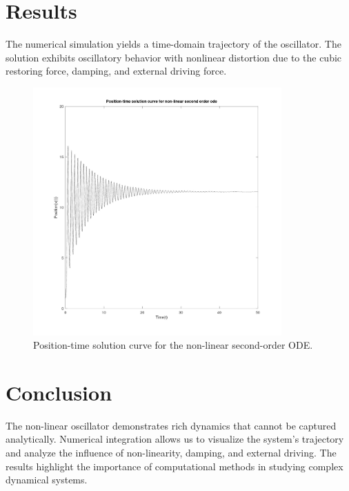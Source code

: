 \section*{Results}
The numerical simulation yields a time-domain trajectory of the oscillator. The solution exhibits oscillatory behavior with nonlinear distortion due to the cubic restoring force, damping, and external driving force.

\begin{figure}[h!]
    \centering
    \includegraphics[width=0.85\textwidth]{a4.jpg}
    \caption{Position-time solution curve for the non-linear second-order ODE.}
\end{figure}

\section*{Conclusion}
The non-linear oscillator demonstrates rich dynamics that cannot be captured analytically. Numerical integration allows us to visualize the system's trajectory and analyze the influence of non-linearity, damping, and external driving. The results highlight the importance of computational methods in studying complex dynamical systems.
